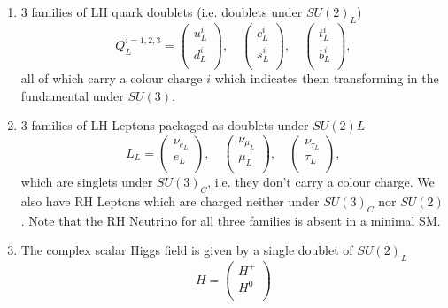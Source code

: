 \begin{enumerate}
	\item $3$ families of LH quark doublets (i.e. doublets under $SU(2)_L$)
	\begin{equation}
		Q^{i=1,2,3}_L = \begin{pmatrix}
		u^i_L\\
		d^i_L \\
		\end{pmatrix},\quad 
		\begin{pmatrix}
		c^i_L\\
		s^i_L \\
		\end{pmatrix}, \quad 
		\begin{pmatrix}
		t^i_L \\
		b^i_L \\
		\end{pmatrix},
	\end{equation}
	all of which carry a colour charge $i$ which indicates them transforming in the fundamental under $SU(3)$. 
	\item $3$ families of LH Leptons packaged as doublets under $SU(2)L$ 
	\begin{equation}
		L_L = \begin{pmatrix}
		\nu_{e_L} \\
		e_L\\
		\end{pmatrix},\quad 
		\begin{pmatrix}
		\nu_{\mu_L} \\
		\mu_L \\
		\end{pmatrix},
		\quad 
		\begin{pmatrix}
		\nu_{\tau_L} \\
		\tau_L\\
		\end{pmatrix},
	\end{equation}
	which are singlets under $SU(3)_C$, i.e. they don't carry a colour charge. We also have RH Leptons which are charged neither under $SU(3)_C$ nor $SU(2)$. Note that the RH Neutrino for all three families is absent in a minimal SM.
	\item The complex scalar Higgs field is given by a single doublet of $SU(2)_L$ 
	\begin{equation}
	H = \begin{pmatrix}
	H^+ \\
	H^0 \\
	\end{pmatrix}

\end{equation}
\end{enumerate}
